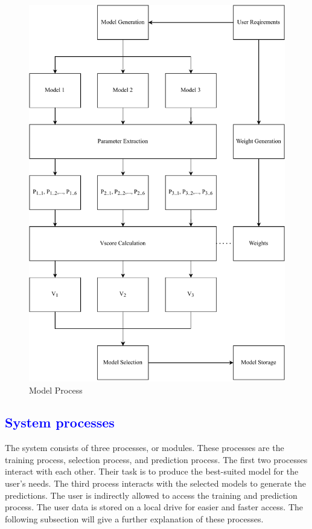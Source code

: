 \documentclass[a4paper,fleqn]{cas-dc}
\newcommand{\responsemod}{\color{blue}}
\newcommand{\responsemodsm}[1]{\textcolor{blue}{#1}}
\newcommand{\subsectionb}[1]{\subsection{\responsemodsm{#1}}}
\begin{document}
\begin{figure}[ht]
    \centering
    \includegraphics[width=1.6\columnwidth]{math_model_relaxed_flow.pdf}
    \caption{Model Process}
    \label{fig:model_process}
\end{figure}

\subsectionb{System processes}\label{subsec:system_processes}

{\responsemod
    The system consists of three processes, or modules. These processes are the training process, selection process, and prediction process. The first two processes interact with each other. Their task is to produce the best-suited model for the user's needs. The third process interacts with the selected models to generate the predictions. The user is indirectly allowed to access the training and prediction process. The user data is stored on a local drive for easier and faster access. The following subsection will give a further explanation of these processes.
}
\end{document}
